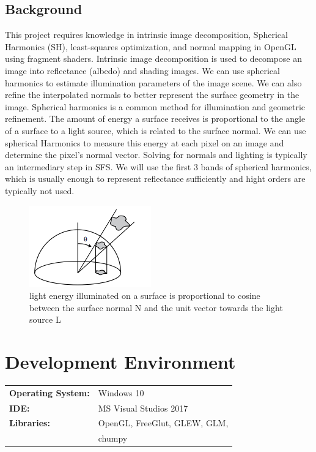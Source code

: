 \documentclass[10pt,twocolumn,letterpaper]{article}
\begin{document}
\subsection{Background}
This project requires knowledge in intrinsic image decomposition, Spherical Harmonics (SH), least-squares optimization, and normal mapping in OpenGL using fragment shaders. 
Intrinsic image decomposition is used to decompose an image into reflectance (albedo) and shading images. We can use spherical harmonics to estimate illumination parameters of the image scene. We can also refine the interpolated normals to better represent the surface geometry in the image. Spherical harmonics is a common method for illumination and geometric refinement.  The amount of energy a surface receives is proportional to the angle of a surface to a light source, which is related to the surface normal. We can use spherical Harmonics to measure this energy at each pixel on an image and determine the pixel's normal vector. Solving for normals and lighting is typically an intermediary step in SFS. We will use the first 3 bands of spherical harmonics, which is usually enough to represent reflectance sufficiently and hight orders are typically not used.
\begin{figure}[h]
	\begin{center}
		\includegraphics [scale=0.8] {image/energy.png}
	\end{center}
	\caption{light energy illuminated on a surface is proportional to cosine between the surface normal N and the unit vector towards the light source L}
	\label{fig:vgg-16}
\end{figure} 


\section{Development Environment}
\begin{table}[h]
	\begin{tabular}{ll}
		\textbf{Operating System:} &  Windows 10  \\
		\textbf{IDE:} &  MS Visual Studios 2017  \\
		\textbf{Libraries:} &  OpenGL, FreeGlut, GLEW, GLM,\\
		&chumpy
	\end{tabular}
\end{table}
\end{document}
